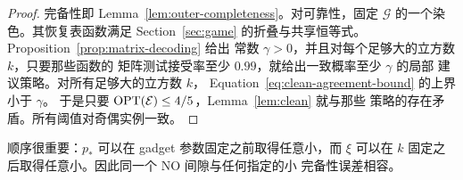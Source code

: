 \begin{proof}
完备性即 Lemma~\ref{lem:outer-completeness}。对可靠性，固定
$\mathcal G$ 的一个染色。其恢复表函数满足 Section~\ref{sec:game}
的折叠与共享恒等式。Proposition~\ref{prop:matrix-decoding} 给出
常数 $\gamma>0$，并且对每个足够大的立方数 $k$，只要那些函数的
矩阵测试接受率至少 $0.99$，就给出一致概率至少 $\gamma$ 的局部
建议策略。对所有足够大的立方数 $k$，
Equation~\eqref{eq:clean-agreement-bound} 的上界小于 $\gamma$。
于是只要 $\operatorname{OPT}(\mathcal E)\le4/5$，Lemma~\ref{lem:clean} 就与那些
策略的存在矛盾。所有阈值对奇偶实例一致。
\end{proof}

顺序很重要：$p_*$ 可以在 gadget 参数固定之前取得任意小，而 $\xi$
可以在 $k$ 固定之后取得任意小。因此同一个 NO 间隙与任何指定的小
完备性误差相容。

